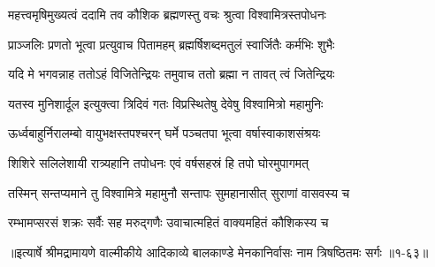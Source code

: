 \twolineshloka
{महत्त्वमृषिमुख्यत्वं ददामि तव कौशिक}
{ब्रह्मणस्तु वचः श्रुत्वा विश्वामित्रस्तपोधनः} %

\twolineshloka
{प्राञ्जलिः प्रणतो भूत्वा प्रत्युवाच पितामहम्}
{ब्रह्मर्षिशब्दमतुलं स्वार्जितैः कर्मभिः शुभैः} %

\twolineshloka
{यदि मे भगवन्नाह ततोऽहं विजितेन्द्रियः}
{तमुवाच ततो ब्रह्मा न तावत् त्वं जितेन्द्रियः} %

\twolineshloka
{यतस्व मुनिशार्दूल इत्युक्त्वा त्रिदिवं गतः}
{विप्रस्थितेषु देवेषु विश्वामित्रो महामुनिः} %

\twolineshloka
{ऊर्ध्वबाहुर्निरालम्बो वायुभक्षस्तपश्चरन्}
{घर्मे पञ्चतपा भूत्वा वर्षास्वाकाशसंश्रयः} %

\twolineshloka
{शिशिरे सलिलेशायी रात्र्यहानि तपोधनः}
{एवं वर्षसहस्रं हि तपो घोरमुपागमत्} %

\twolineshloka
{तस्मिन् सन्तप्यमाने तु विश्वामित्रे महामुनौ}
{सन्तापः सुमहानासीत् सुराणां वासवस्य च} %

\twolineshloka
{रम्भामप्सरसं शक्रः सर्वैः सह मरुद्गणैः}
{उवाचात्महितं वाक्यमहितं कौशिकस्य च} %


॥इत्यार्षे श्रीमद्रामायणे वाल्मीकीये आदिकाव्ये बालकाण्डे मेनकानिर्वासः नाम त्रिषष्ठितमः सर्गः ॥१-६३॥
